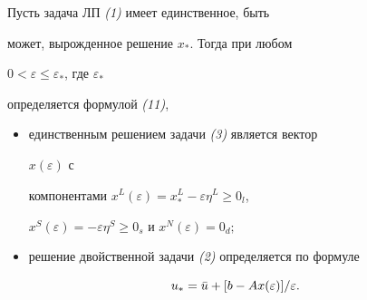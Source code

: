 \begin{thm} Пусть задача ЛП {\em (1)} имеет единственное, быть


может, вырожденное решение $x_*$. Тогда при любом


$0<\varepsilon\le\varepsilon_*$, где $\varepsilon_*$


определяется формулой {\em (11)},


\begin{itemize}


\item[1)] единственным решением задачи {\em (3)} является вектор


$x(\varepsilon)$ с


компонентами $x^L(\varepsilon)=x^L_*-\varepsilon\eta^L\ge 0_l$,


$x^S(\varepsilon)=-\varepsilon\eta^S\ge 0_s$ и $x^N(\varepsilon)=0_d;$


\item[2)] решение двойственной задачи {\em (2)} определяется по формуле


\end{itemize}


\begin{equation}


u_*=\Bar u+[b-Ax(\varepsilon)]/\varepsilon.


\end{equation}


\end{thm}





